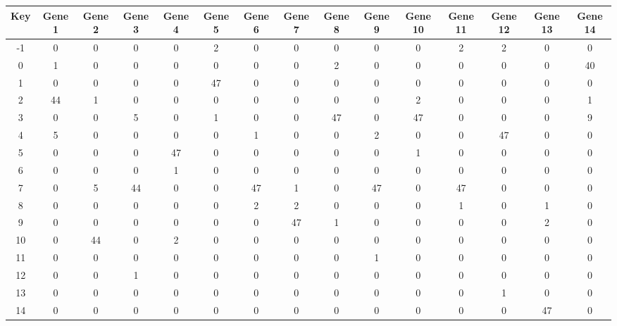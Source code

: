 \begin{tabular}{|c|c|c|c|c|c|c|c|c|c|c|c|c|c|c|}
\hline
Key & Gene 1 & Gene 2 & Gene 3 & Gene 4 & Gene 5 & Gene 6 & Gene 7 & Gene 8 & Gene 9 & Gene 10 & Gene 11 & Gene 12 & Gene 13 & Gene 14 \\
\hline
-1 & 0 & 0 & 0 & 0 & 2 & 0 & 0 & 0 & 0 & 0 & 2 & 2 & 0 & 0 \\
0 & 1 & 0 & 0 & 0 & 0 & 0 & 0 & 2 & 0 & 0 & 0 & 0 & 0 & 40 \\
1 & 0 & 0 & 0 & 0 & 47 & 0 & 0 & 0 & 0 & 0 & 0 & 0 & 0 & 0 \\
2 & 44 & 1 & 0 & 0 & 0 & 0 & 0 & 0 & 0 & 2 & 0 & 0 & 0 & 1 \\
3 & 0 & 0 & 5 & 0 & 1 & 0 & 0 & 47 & 0 & 47 & 0 & 0 & 0 & 9 \\
4 & 5 & 0 & 0 & 0 & 0 & 1 & 0 & 0 & 2 & 0 & 0 & 47 & 0 & 0 \\
5 & 0 & 0 & 0 & 47 & 0 & 0 & 0 & 0 & 0 & 1 & 0 & 0 & 0 & 0 \\
6 & 0 & 0 & 0 & 1 & 0 & 0 & 0 & 0 & 0 & 0 & 0 & 0 & 0 & 0 \\
7 & 0 & 5 & 44 & 0 & 0 & 47 & 1 & 0 & 47 & 0 & 47 & 0 & 0 & 0 \\
8 & 0 & 0 & 0 & 0 & 0 & 2 & 2 & 0 & 0 & 0 & 1 & 0 & 1 & 0 \\
9 & 0 & 0 & 0 & 0 & 0 & 0 & 47 & 1 & 0 & 0 & 0 & 0 & 2 & 0 \\
10 & 0 & 44 & 0 & 2 & 0 & 0 & 0 & 0 & 0 & 0 & 0 & 0 & 0 & 0 \\
11 & 0 & 0 & 0 & 0 & 0 & 0 & 0 & 0 & 1 & 0 & 0 & 0 & 0 & 0 \\
12 & 0 & 0 & 1 & 0 & 0 & 0 & 0 & 0 & 0 & 0 & 0 & 0 & 0 & 0 \\
13 & 0 & 0 & 0 & 0 & 0 & 0 & 0 & 0 & 0 & 0 & 0 & 1 & 0 & 0 \\
14 & 0 & 0 & 0 & 0 & 0 & 0 & 0 & 0 & 0 & 0 & 0 & 0 & 47 & 0 \\
\hline
\end{tabular}